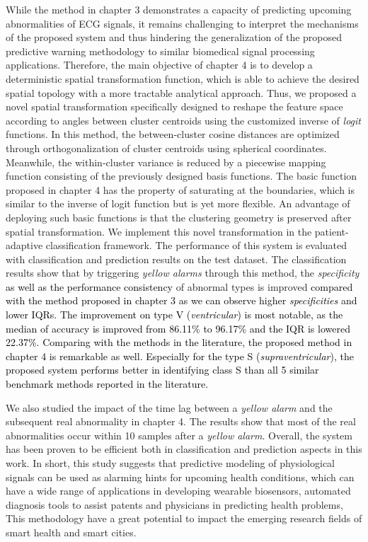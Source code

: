 While the method in chapter 3 demonstrates a capacity of predicting upcoming abnormalities of ECG signals, it remains challenging to interpret the mechanisms of the proposed system and thus hindering the generalization of the proposed predictive warning methodology to similar  biomedical signal processing applications. Therefore, the main objective of chapter 4 is to develop a deterministic spatial transformation function, which is able to achieve the desired spatial topology with a more tractable analytical approach. Thus, we proposed a novel spatial transformation specifically designed to reshape the feature space according to angles between cluster centroids using the customized inverse of \textit{logit} functions. In this method, the between-cluster cosine distances are optimized through orthogonalization of cluster centroids using spherical coordinates. Meanwhile, the within-cluster variance is reduced by a piecewise mapping function consisting of the previously designed basis functions. The basic function proposed in chapter 4 has the property of saturating at the boundaries, which is similar to the inverse of logit function but is yet more flexible. An advantage of deploying such basic functions is that the clustering geometry is preserved after spatial transformation. 
We implement this novel transformation in the patient-adaptive classification framework. The performance of this system is evaluated with classification and prediction results on the test dataset. The classification results show that by triggering \textit{yellow alarms} through this method, the \textit{specificity} \textcolor{black}{as well as the performance consistency }of abnormal types is improved   \textcolor{black}{compared with the method proposed in chapter 3 as we can observe higher \textit{specificities} and lower IQRs. The improvement on type V (\textit{ventricular}) is most notable, as the median of accuracy is improved from 86.11\% to 96.17\% and the IQR is lowered 22.37\%.} 
\textcolor{black}{Comparing with the methods in the literature, the proposed method in chapter 4 is remarkable as well. Especially for the type S (\textit{supraventricular}), the proposed system performs better in identifying class S than all 5 similar benchmark methods reported in the literature.}

We also studied the impact of the time lag between a \textit{yellow alarm} and the subsequent real abnormality in chapter 4. The results show that most of the real abnormalities occur within 10 samples after a \textit{yellow alarm}. Overall, the system has been proven to be efficient both in classification and prediction aspects in this work. In short, this study suggests that predictive modeling of physiological signals can be used as alarming hints for upcoming health conditions, which can have a wide range of applications in developing wearable biosensors,  automated diagnosis tools to assist patents and physicians in predicting health problems, This methodology have a great potential to impact the emerging research fields of smart health and smart cities.  


